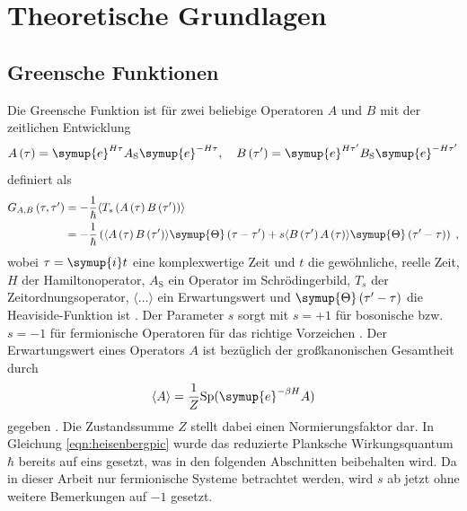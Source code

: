 \chapter{Theoretische Grundlagen}
\label{chap:theoretische_grundlagen}
\section{Greensche Funktionen}
Die Greensche Funktion ist für zwei beliebige Operatoren $A$ und $B$ mit der zeitlichen Entwicklung 
\begin{equation}
    A \left ( \tau \right ) = \symup{e}^{H \tau} A_\text{S} \symup{e}^{-H \tau}  \label{eqn:heisenbergpic}, 
    \quad B \left ( \tau' \right ) = \symup{e}^{H \tau'} B_\text{S} \symup{e}^{-H \tau'}
\end{equation}
definiert als 
\begin{align}
    G_{A,B} \left (\tau, \tau' \right ) &= - \frac{1}{\hbar} \langle T_s \left ( A \left (\tau \right ) B \left ( \tau' \right ) \right ) \rangle \\
    & = - \frac{1}{\hbar} \left(  \langle A \left (\tau \right ) B \left ( \tau' \right ) \rangle \symup{\Theta} \left ( \tau - \tau' \right) + s 
    \langle B \left ( \tau' \right ) A \left (\tau \right ) \rangle \symup{\Theta} \left ( \tau' - \tau \right)  \right ) \; \text{,} \label{eqn:greensfunction}
\end{align}
wobei $\tau = \symup{i}t$ eine komplexwertige Zeit und $t$ die gewöhnliche, reelle Zeit, $H$ der Hamiltonoperator, $A_\text{S}$ ein Operator im Schrödingerbild, $T_s$ der Zeitordnungsoperator, 
$\langle \ldots \rangle$ ein Erwartungswert und $\symup{\Theta} \left ( \tau' - \tau \right)$ die Heaviside-Funktion ist \cite{anders-fkt, greensfunction}.
Der Parameter $s$ sorgt mit $s=+1$ für bosonische bzw. $s=-1$ für fermionische Operatoren für das richtige Vorzeichen \cite{anders-fkt, greensfunction}.
Der Erwartungswert eines Operators $A$ ist bezüglich der großkanonischen Gesamtheit durch 
\begin{equation*}
    \langle A \rangle = \frac{1}{Z} \text{Sp}(\symup{e}^{-\beta H} A)
\end{equation*}
gegeben \cite{greensfunction}.
Die Zustandssumme $Z$ stellt dabei einen Normierungsfaktor dar.
In Gleichung \eqref{eqn:heisenbergpic} wurde das reduzierte Planksche Wirkungsquantum $\hbar$ bereits auf eins gesetzt, was in den folgenden Abschnitten beibehalten wird.
Da in dieser Arbeit nur fermionische Systeme betrachtet werden, wird $s$ ab jetzt ohne weitere Bemerkungen auf $-1$ gesetzt.
